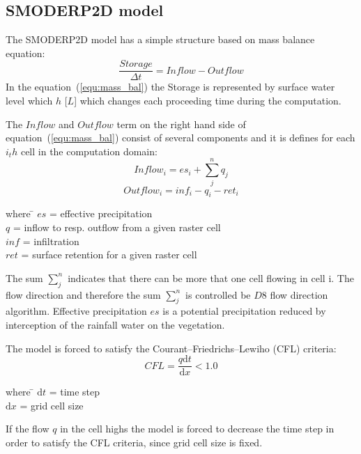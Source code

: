 \subsection{SMODERP2D model}
The SMODERP2D model has a simple structure based on mass balance equation:
\begin{equation}\label{equ:mass_bal}
    \frac{Storage}{\Delta t} = \nonumber  
    Inflow - Outflow
\end{equation}
In the equation~(\ref{equ:mass_bal}) the Storage is represented by
surface water level which $h$ [$L$] which changes each proceeding time
during the computation.

The $Inflow$ and $Outflow$ term on the right hand side of
equation~(\ref{equ:mass_bal}) consist of several components and it is
defines for each $i_th$ cell in the computation domain:
\begin{equation}\label{equ:inflow}
    Inflow_i = es_{i} + \sum_j^n q_{j}
\end{equation}
\begin{equation}\label{equ:outflow}
    Outflow_i = inf_{i} - q_{i} - ret_i
\end{equation}
\begin{tabbing} 
where \hspace{0.6cm} \= $es$ = effective precipitation\\
\> $q$ = inflow to resp. outflow from a given raster cell\\
\> $inf$ = infiltration\\
\> $ret$ = surface retention for a given raster cell
\end{tabbing}
The sum $\sum_j^n$ indicates that there can be more that one cell
flowing in cell i. The flow direction and therefore the sum $\sum_j^n$
is controlled be $D8$ flow direction algorithm.  Effective
precipitation $es$ is a potential precipitation reduced by
interception of the rainfall water on the vegetation.

The model is forced to satisfy the Courant–Friedrichs–Lewiho (CFL)
criteria:
\begin{equation}\label{equ:CFL}
    CFL = \frac{q\textrm{d}t}{\textrm{d}x} < 1.0
\end{equation}
\begin{tabbing} 
where \hspace{0.6cm} \= $\textrm{d}t$ = time step\\
\> $\textrm{d}x$ = grid cell size
\end{tabbing}
If the flow $q$ in the cell highs the model is forced to decrease the
time step in order to satisfy the CFL criteria, since grid cell size
is fixed.

